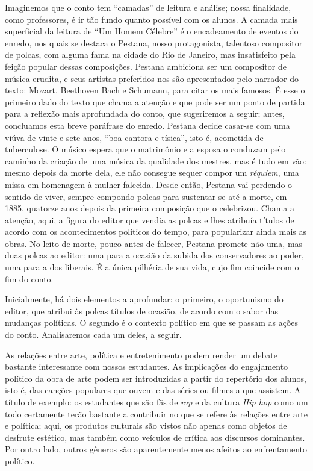 \documentclass[12pt]{extarticle}
\begin{document}
Imaginemos que o conto tem ``camadas'' de leitura e análise; nossa
finalidade, como professores, é ir tão fundo quanto possível com os
alunos. A camada mais superficial da leitura de ``Um Homem Célebre'' é o
encadeamento de eventos do enredo, nos quais se destaca o Pestana, nosso
protagonista, talentoso compositor de polcas, com alguma fama na cidade
do Rio de Janeiro, mas insatisfeito pela feição popular dessas
composições. Pestana ambiciona ser um compositor de música erudita, e
seus artistas preferidos nos são apresentados pelo narrador do texto:
Mozart, Beethoven Bach e Schumann, para citar os mais famosos. É esse o
primeiro dado do texto que chama a atenção e que pode ser um ponto de
partida para a reflexão mais aprofundada do conto, que sugeriremos a
seguir; antes, concluamos esta breve paráfrase do enredo. Pestana decide
casar-se com uma viúva de vinte e sete anos, ``boa cantora e tísica'',
isto é, acometida de tuberculose. O músico espera que o matrimônio e a
esposa o conduzam pelo caminho da criação de uma música da qualidade dos
mestres, mas é tudo em vão: mesmo depois da morte dela, ele não consegue
sequer compor um \emph{réquiem}, uma missa em homenagem à mulher
falecida. Desde então, Pestana vai perdendo o sentido de viver, sempre
compondo polcas para sustentar-se até a morte, em 1885, quatorze anos
depois da primeira composição que o celebrizou. Chama a atenção, aqui, a
figura do editor que vendia as polcas e lhes atribuía títulos de acordo
com os acontecimentos políticos do tempo, para popularizar ainda mais as
obras. No leito de morte, pouco antes de falecer, Pestana promete não
uma, mas duas polcas ao editor: uma para a ocasião da subida dos
conservadores ao poder, uma para a dos liberais. É a única pilhéria de
sua vida, cujo fim coincide com o fim do conto.

Inicialmente, há dois elementos a aprofundar: o primeiro, o oportunismo
do editor, que atribui às polcas títulos de ocasião, de acordo com o
sabor das mudanças políticas. O segundo é o contexto político em que se
passam as ações do conto. Analisaremos cada um deles, a seguir.

As relações entre arte, política e entretenimento podem render um debate
bastante interessante com nossos estudantes. As implicações do
engajamento político da obra de arte podem ser introduzidas a partir do
repertório dos alunos, isto é, das canções populares que ouvem e das
séries ou filmes a que assistem. A título de exemplo: os estudantes que
são fãs de \emph{rap} e da cultura \emph{Hip hop} como um todo
certamente terão bastante a contribuir no que se refere às relações
entre arte e política; aqui, os produtos culturais são vistos não apenas
como objetos de desfrute estético, mas também como veículos de crítica
aos discursos dominantes. Por outro lado, outros gêneros são
aparentemente menos afeitos ao enfrentamento político.
\end{document}
